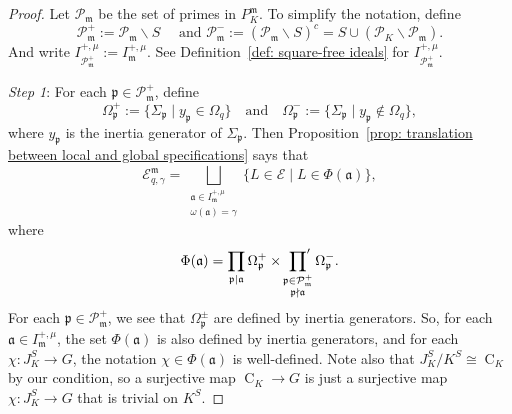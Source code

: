 \documentclass{amsart}
\numberwithin{equation}{section}
\theoremstyle{plain}
\theoremstyle{definition}
\theoremstyle{remark}
\begin{document}
\begin{proof}
    Let $\mathcal{P}_{\mathfrak{m}}$ be the set of primes in $P_K^{\mathfrak{m}}$.
    To simplify the notation, define
    \begin{equation*}
        \mathcal{P}_{\mathfrak{m}}^+:=\mathcal{P}_{\mathfrak{m}}\backslash S\quad\text{ and }\mathcal{P}_{\mathfrak{m}}^-:=(\mathcal{P}_{\mathfrak{m}}\backslash S)^c=S\cup(\mathcal{P}_K\backslash\mathcal{P}_{\mathfrak{m}}).
    \end{equation*}
    And write $I^{+,\mu}_{\mathcal{P}_{\mathfrak{m}}^+}:=I^{+,\mu}_{\mathfrak{m}}$.
    See Definition~\ref{def: square-free ideals} for $I^{+,\mu}_{\mathcal{P}_{\mathfrak{m}}^+}$.
    
    \emph{Step 1}:	
	For each $\mathfrak{p}\in\mathcal{P}_{\mathfrak{m}}^+$, define
	\begin{equation*}
		\Omega_{\mathfrak{p}}^+:=\{\Sigma_{\mathfrak{p}}\mid y_{\mathfrak{p}}\in\Omega_q\}
		\quad\text{and}\quad
		\Omega_{\mathfrak{p}}^-:=\{\Sigma_{\mathfrak{p}}\mid y_{\mathfrak{p}}\notin\Omega_q\},
	\end{equation*}
	where $y_{\mathfrak{p}}$ is the inertia generator of $\Sigma_{\mathfrak{p}}$.
	Then Proposition~\ref{prop: translation between local and global specifications} says that
	\begin{equation*}
		\mathcal{E}^{\mathfrak{m}}_{q,\gamma}=
		\bigsqcup_{
			\substack{
				\mathfrak{a}\in I^{+,\mu}_{\mathfrak{m}}\\
				\omega(\mathfrak{a})=\gamma
			}
		}\{L\in\mathcal{E}\mid L\in\Phi(\mathfrak{a})\},
	\end{equation*}
	where
	\begin{equation*}
		\Phi(\mathfrak{a})=\prod_{\mathfrak{p}\mid\mathfrak{a}}\Omega_{\mathfrak{p}}^+
		\times
		\sideset{}{'}\prod_{
			\substack{
				\mathfrak{p}\in\mathcal{P}_{\mathfrak{m}}^+\\
				\mathfrak{p}\nmid\mathfrak{a}
			}
		}\Omega_{\mathfrak{p}}^-.
	\end{equation*}    
	For each $\mathfrak{p}\in\mathcal{P}_{\mathfrak{m}}^+$, we see that $\Omega_{\mathfrak{p}}^{\pm}$ are defined by inertia generators.
	So, for each $\mathfrak{a}\in I^{+,\mu}_{\mathfrak{m}}$, the set $\Phi(\mathfrak{a})$ is also defined by inertia generators,
	and for each $\chi:J_K^S\to G$, the notation $\chi\in\Phi(\mathfrak{a})$ is well-defined.
	Note also that $J_K^S/K^S\cong\operatorname{C}_K$ by our condition, so a surjective map $\operatorname{C}_K\to G$ is just a surjective map $\chi:J_K^S\to G$ that is trivial on $K^S$.

\end{proof}
\end{document}
